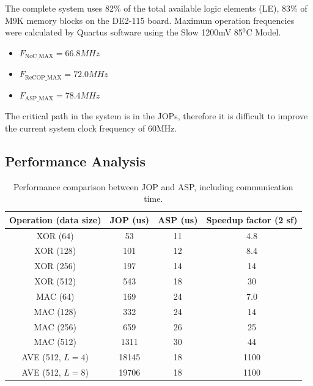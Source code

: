 \documentclass[]{article}
\begin{document}
	The complete system uses 82\% of the total available logic elements (LE), 83\% of M9K memory blocks on the DE2-115 board. Maximum operation frequencies were calculated by Quartus software using the Slow 1200mV 85$^0$C Model. 
	
	\begin{itemize}
		\centering
		\item $F_{\text{NoC\_MAX}} = 66.8 MHz$
		\item $F_{\text{ReCOP\_MAX}} = 72.0 MHz$
		\item $F_{\text{ASP\_MAX}} = 78.4 MHz$
	\end{itemize}
	
	The critical path in the system is in the JOPs, therefore it is difficult to improve the current system clock frequency of $60 \text{MHz}$.\\
	
	
	
	\subsection{Performance Analysis}
	\begin{table}[H]
		\centering
		\begin{tabular}{|c|c|c|c|}
			\hline
			\textbf{Operation (data size)}  & \textbf{JOP (us)} & \textbf{ASP (us)} & \textbf{Speedup factor (2 sf)} \\ \hline \hline
			XOR (64)    & 53       & 11       & 4.8     \\ \hline
			XOR (128)   & 101      & 12       & 8.4     \\ \hline 
			XOR (256)   & 197      & 14       & 14      \\ \hline
			XOR (512)   & 543      & 18       & 30      \\ \hline\hline
			MAC (64)    & 169      & 24       & 7.0     \\ \hline
			MAC (128)   & 332      & 24       & 14      \\ \hline
			MAC (256)   & 659      & 26       & 25      \\ \hline
			MAC (512)   & 1311     & 30       & 44      \\ \hline\hline
			
			AVE (512, $L=4$) & 18145    & 18       & 1100    \\ \hline
			AVE (512, $L=8$) & 19706    & 18       & 1100    \\ \hline
		\end{tabular}
		\caption{Performance comparison between JOP and ASP, including communication time.}
		\label{table:performance_comparison}
	\end{table}
	
\end{document}
